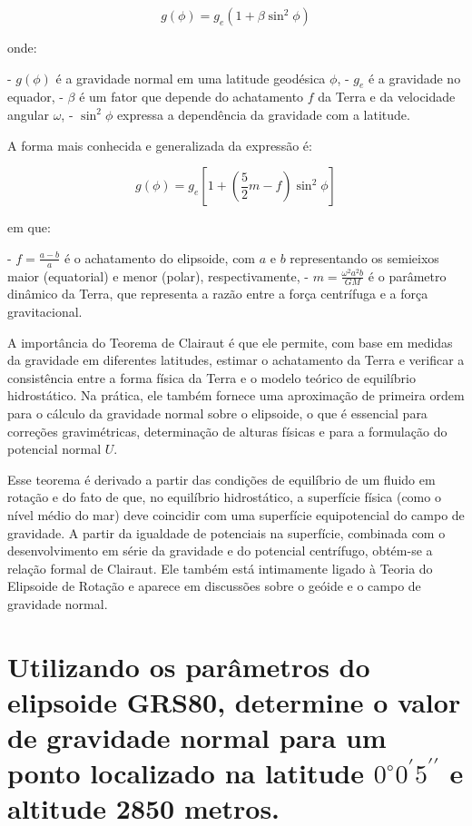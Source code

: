 \[
g(\phi) = g_e \left( 1 + \beta \sin^2 \phi \right)
\]

onde:

- \( g(\phi) \) é a gravidade normal em uma latitude geodésica \( \phi \),
- \( g_e \) é a gravidade no equador,
- \( \beta \) é um fator que depende do achatamento \( f \) da Terra e da velocidade angular \( \omega \),
- \( \sin^2 \phi \) expressa a dependência da gravidade com a latitude.

A forma mais conhecida e generalizada da expressão é:

\[
g(\phi) = g_e \left[ 1 + \left( \frac{5}{2}m - f \right)\sin^2 \phi \right]
\]

em que:

- \( f = \frac{a - b}{a} \) é o achatamento do elipsoide, com \( a \) e \( b \) representando os semieixos maior (equatorial) e menor (polar), respectivamente,
- \( m = \frac{\omega^2 a^2 b}{GM} \) é o parâmetro dinâmico da Terra, que representa a razão entre a força centrífuga e a força gravitacional.

A importância do Teorema de Clairaut é que ele permite, com base em medidas da gravidade em diferentes latitudes, estimar o achatamento da Terra e verificar a consistência entre a forma física da Terra e o modelo teórico de equilíbrio hidrostático. Na prática, ele também fornece uma aproximação de primeira ordem para o cálculo da gravidade normal sobre o elipsoide, o que é essencial para correções gravimétricas, determinação de alturas físicas e para a formulação do potencial normal \( U \).

Esse teorema é derivado a partir das condições de equilíbrio de um fluido em rotação e do fato de que, no equilíbrio hidrostático, a superfície física (como o nível médio do mar) deve coincidir com uma superfície equipotencial do campo de gravidade. A partir da igualdade de potenciais na superfície, combinada com o desenvolvimento em série da gravidade e do potencial centrífugo, obtém-se a relação formal de Clairaut. Ele também está intimamente ligado à Teoria do Elipsoide de Rotação e aparece em discussões sobre o geóide e o campo de gravidade normal.


\section{Utilizando os parâmetros do elipsoide GRS80, determine o valor de gravidade normal para um ponto localizado na latitude \(0^\circ 0^\prime 5^{\prime\prime}\) e altitude 2850 metros.}

